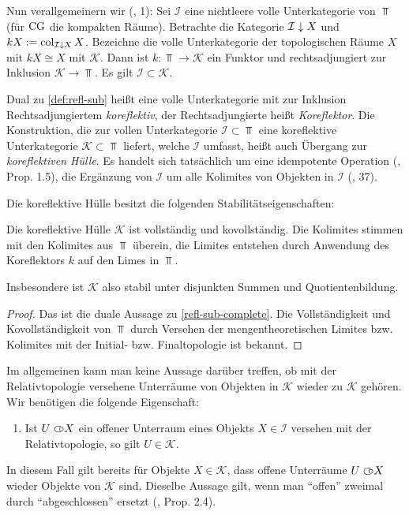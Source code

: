 Nun verallgemeinern wir (\cite{Vogt}, 1): Sei $\mathcal{I}$ eine
nichtleere volle Unterkategorie von $\Top$ (für $\operatorname{CG}$ die kompakten
Räume). Betrachte die Kategorie $\mathcal{I} \downarrow \! {\scriptstyle } \, X$ und $kX
:= \operatorname{col}_{\mathcal{I} \downarrow \! {\scriptstyle } \, X} X$. Bezeichne die volle
Unterkategorie der topologischen Räume $X$ mit $kX \cong X$ mit
$\mathcal{K}$. Dann ist $k: \Top \to \mathcal{K}$ ein Funktor und
rechtsadjungiert zur Inklusion $\mathcal{K} \to \Top$. Es gilt
$\mathcal{I} \subset \mathcal{K}$.
\begin{bem} \label{corefl}
  Dual zu \ref{def:refl-sub} heißt eine volle Unterkategorie mit zur
  Inklusion Rechtsadjungiertem \emph{koreflektiv}, der
  Rechtsadjungierte heißt \emph{Koreflektor}. Die Konstruktion, die
  zur vollen Unterkategorie $\mathcal{I} \subset \Top$ eine
  koreflektive Unterkategorie $\mathcal{K} \subset \Top$ liefert,
  welche $\mathcal{I}$ umfasst, heißt auch Übergang zur
  \emph{koreflektiven Hülle}. Es handelt sich tatsächlich um eine
  idempotente Operation (\cite{Vogt}, Prop. 1.5), die Ergänzung von
  $\mathcal{I}$ um alle Kolimites von Objekten in $\mathcal{I}$
  (\cite{Herrlich}, 37).
\end{bem}
Die koreflektive Hülle besitzt die folgenden Stabilitätseigenschaften:
\begin{prop} \label{k-complete}
  Die koreflektive Hülle $\mathcal{K}$ ist vollständig und
  kovollständig. Die Kolimites stimmen mit den Kolimites aus $\Top$
  überein, die Limites entstehen durch Anwendung des Koreflektors $k$
  auf den Limes in $\Top$.
\end{prop}
Insbesondere ist $\mathcal{K}$ also stabil unter disjunkten Summen und
Quotientenbildung.
\begin{proof}
  Das ist die duale Aussage zu \ref{refl-sub-complete}. Die
  Vollständigkeit und Kovollständigkeit von $\Top$ durch Versehen der
  mengentheoretischen Limites bzw. Kolimites mit der Initial-
  bzw. Finaltopologie ist bekannt.
\end{proof}

Im allgemeinen kann man keine Aussage darüber treffen, ob mit der
Relativtopologie versehene Unterräume von Objekten in $\mathcal{K}$
wieder zu $\mathcal{K}$ gehören. Wir benötigen die folgende
Eigenschaft:
\begin{enumerate}
\item \label{itm:k-axiom-subspace} Ist $U \subset\kern-0.58em\circ X$ ein offener
  Unterraum eines Objekts $X \in \mathcal{I}$ versehen mit der
  Relativtopologie, so gilt $U \in \mathcal{K}$.
\end{enumerate}
In diesem Fall gilt bereits für Objekte $X \in \mathcal{K}$, dass
offene Unterräume $U \subset\kern-0.58em\circ X$ wieder Objekte von $\mathcal{K}$
sind. Dieselbe Aussage gilt, wenn man ``offen'' zweimal durch
``abgeschlossen'' ersetzt (\cite{Vogt}, Prop. 2.4).

